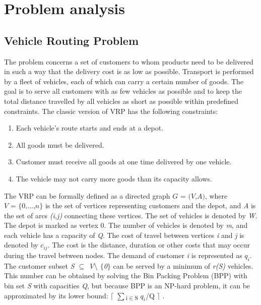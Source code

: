 \documentclass[a4paper,twoside,12pt]{book}
\begin{document}
\chapter{Problem analysis}

\section{Vehicle Routing Problem}
The problem concerns a set of customers to whom products need to be delivered in such a way that the delivery cost is as low as possible. Transport is performed by a fleet of vehicles, each of which can carry a certain number of goods. The goal is to serve all customers with as few vehicles as possible and to keep the total distance travelled by all vehicles as short as possible within predefined constraints. The classic version of VRP has the following constraints: 
\begin{enumerate}
	\item Each vehicle's route starts and ends at a depot.
	\item All goods must be delivered.
	\item Customer must receive all goods at one time delivered by one vehicle.
	\item The vehicle may not carry more goods than its capacity allows.	
\end{enumerate}

The VRP can be formally defined as a directed graph $\textit{G = (V,A)}$, where $\textit{V = $\lbrace$0,\ldots,n$\rbrace$}$ is the set of vertices representing customers and the depot, and \textit{A} is the set of arcs \textit{(i,j)} connecting these vertices. The set of vehicles is denoted by \textit{W}. The depot is marked as vertex 0. The number of vehicles is denoted by \textit{m}, and each vehicle has a capacity of \textit{Q}. The cost of travel between vertices \textit{i} and \textit{j} is denoted by \textit{$c_{ij}$}. The cost is the distance, duration or other costs that may occur during the travel between nodes. The demand of customer \textit{i} is represented as \textit{$q_{i}$}.
The customer subset \textit{S $\subseteq$ V$\setminus$ $\lbrace$0$\rbrace$} can be served by a minimum of \textit{r(S)} vehicles. This number can be obtained by solving the Bin Packing Problem (BPP) with bin set \textit{S} with capacities \textit{Q}, but because BPP is an NP-hard problem, it can be approximated by its lower bound: $\lceil$ $\sum$\textsubscript{i$\in$S} $q_{i}$/Q $\rceil$ \cite{bib:article:CordeauVehicleRouting}.
\end{document}
